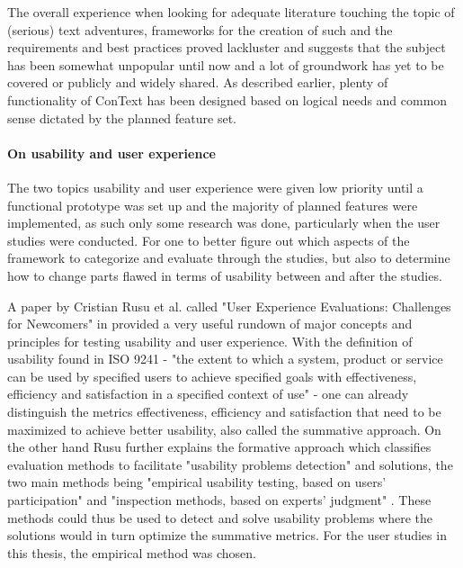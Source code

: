 The overall experience when looking for adequate literature touching the topic of (serious) text adventures, frameworks for the creation of such and the requirements and best practices proved lackluster and suggests that the subject has been somewhat unpopular until now and a lot of groundwork has yet to be covered or publicly and widely shared. As described earlier, plenty of functionality of ConText has been designed based on logical needs and common sense dictated by the planned feature set. 
\paragraph{On usability and user experience}
The two topics usability and user experience were given low priority until a functional prototype was set up and the majority of planned features were implemented, as such only some research was done, particularly when the user studies were conducted. 
For one to better figure out which aspects of the framework to categorize and evaluate through the studies, but also to determine how to change parts flawed in terms of usability between and after the studies. 

A paper by Cristian Rusu et al. called "User Experience Evaluations: Challenges for Newcomers" in \cite{DUXU} provided a very useful rundown of major concepts and principles for testing usability and user experience. With the definition of usability found in ISO 9241 - "the extent to which a system, product or service can be used by specified users to achieve specified goals with effectiveness, efficiency and satisfaction in a specified context of use" \cite[p.~237]{DUXU1}\cite{UISO} - one can already distinguish the metrics effectiveness, efficiency and satisfaction that need to be maximized to achieve better usability, also called the summative approach. On the other hand Rusu further explains the formative approach which classifies evaluation methods to facilitate "usability problems detection" and solutions, the two main methods being "empirical usability testing, based on users' participation" and "inspection methods, based on experts' judgment" \cite[p.~240]{DUXU1}. 
These methods could thus be used to detect and solve usability problems where the solutions would in turn optimize the summative metrics. For the user studies in this thesis, the empirical method was chosen. 

